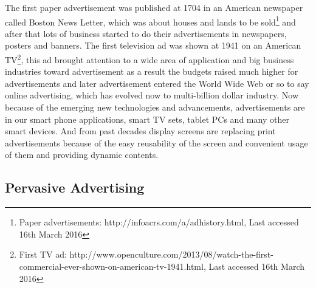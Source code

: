 The first paper advertisement was published at 1704 in an American newspaper called Boston News Letter, which was about houses and lands to be sold\footnote{Paper advertisements: http://infoacrs.com/a/adhistory.html, Last accessed 16th March 2016} and after that lots of business started to do their advertisements in newspapers, posters and banners. The first television ad was shown at 1941 on an American TV\footnote {First TV ad: http://www.openculture.com/2013/08/watch-the-first-commercial-ever-shown-on-american-tv-1941.html, Last accessed 16th March 2016}, this ad brought attention to a wide area of application and big business industries toward advertisement as a result the budgets raised much higher for advertisements and later advertisement entered the World Wide Web or so to say online advertising, which has evolved now to multi-billion dollar industry. Now because of the emerging new technologies and advancements, advertisements are in our smart phone applications, smart TV sets, tablet PCs and many other smart devices. And from past decades display screens are replacing print advertisements because of the easy reusability of the screen and convenient usage of them and providing dynamic contents.


\subsection{Pervasive Advertising}

